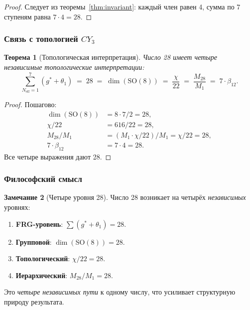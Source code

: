 \documentclass[11pt,a4paper]{article}
\newcommand{\SO}{\ensuremath{\mathrm{SO}}}
\newcommand{\CY}{\ensuremath{CY_3}}
\newtheorem{theorem}{Теорема}[section]
\theoremstyle{definition}
\newtheorem{remark}[theorem]{Замечание}
\begin{document}
\begin{proof}
Следует из теоремы~\ref{thm:invariant}: каждый член равен 4,
сумма по 7 ступеням равна $7 \cdot 4 = 28$.
\end{proof}

\subsubsection{Связь с топологией \texorpdfstring{$\CY$}{}}

\begin{theorem}[Топологическая интерпретация]
\label{thm:topology-link}
Число 28 имеет четыре независимые топологические интерпретации:
\begin{equation}
    \boxed{
    \sum_{N_{\text{eff}} = 1}^{7} (g^* + \theta_1)
    \;=\; 28
    \;=\; \dim(\SO(8))
    \;=\; \frac{\chi}{22}
    \;=\; \frac{M_{28}}{M_1}
    \;=\; 7 \cdot \beta_{12}.
    }
    \label{eq:topology-link-main}
\end{equation}
\end{theorem}

\begin{proof}
Пошагово:
\begin{align}
    \dim(\SO(8)) &= 8 \cdot 7 / 2 = 28, \\
    \chi / 22 &= 616 / 22 = 28, \\
    M_{28}/M_1 &= (M_1 \cdot \chi/22) / M_1 = \chi/22 = 28, \\
    7 \cdot \beta_{12} &= 7 \cdot 4 = 28.
\end{align}
Все четыре выражения дают 28.
\end{proof}

\subsubsection{Философский смысл}

\begin{remark}[Четыре уровня 28]
\label{rem:four-28}
Число 28 возникает на четырёх \emph{независимых} уровнях:
\begin{enumerate}
    \item \textbf{FRG-уровень}: $\sum(g^* + \theta_1) = 28$.
    \item \textbf{Групповой}: $\dim(\SO(8)) = 28$.
    \item \textbf{Топологический}: $\chi/22 = 28$.
    \item \textbf{Иерархический}: $M_{28}/M_1 = 28$.
\end{enumerate}
Это \emph{четыре независимых пути} к одному числу, что усиливает
структурную природу результата.
\end{remark}
\end{document}
